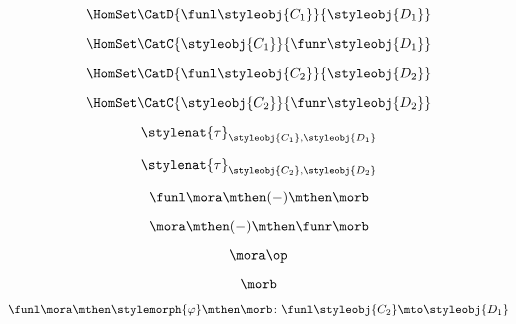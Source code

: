 {\begin{forslides}
    \begin{equation}
        \label{eq:slides_adjunctions_62}
        \HomSet\CatD{\funl \styleobj{C_1}}{\styleobj{D_1}}
    \end{equation}

    \begin{equation}
        \label{eq:slides_adjunctions_63}
        \HomSet\CatC{\styleobj{C_1}}{\funr \styleobj{D_1} }
    \end{equation}

    \begin{equation}
        \label{eq:slides_adjunctions_64}
        \HomSet\CatD{\funl \styleobj{C_2}}{\styleobj{D_2}}
    \end{equation}

    \begin{equation}
        \label{eq:slides_adjunctions_65}
        \HomSet\CatC{\styleobj{C_2}}{\funr \styleobj{D_2} }
    \end{equation}

    \begin{equation}
        \label{eq:slides_adjunctions_66}
        \stylenat{\tau}_{\styleobj{C_1},\styleobj{D_1}}
    \end{equation}

    \begin{equation}
        \label{eq:slides_adjunctions_67}
        \stylenat{\tau}_{\styleobj{C_2},\styleobj{D_2}}
    \end{equation}

    \begin{equation}
        \label{eq:slides_adjunctions_68}
        \funl \mora \mthen ( - ) \mthen \morb
    \end{equation}

    \begin{equation}
        \label{eq:slides_adjunctions_69}
        \mora \mthen ( - ) \mthen \funr \morb
    \end{equation}

    \begin{equation}
        \label{eq:slides_adjunctions_70}
        \mora \op
    \end{equation}

    \begin{equation}
        \label{eq:slides_adjunctions_71}
        \morb
    \end{equation}

    \begin{equation}
        \label{eq:slides_adjunctions_72}
        \funl \mora \mthen \stylemorph{\varphi} \mthen \morb \colon \funl \styleobj{C_2} \mto \styleobj{D_1}
    \end{equation}


\end{forslides}}
